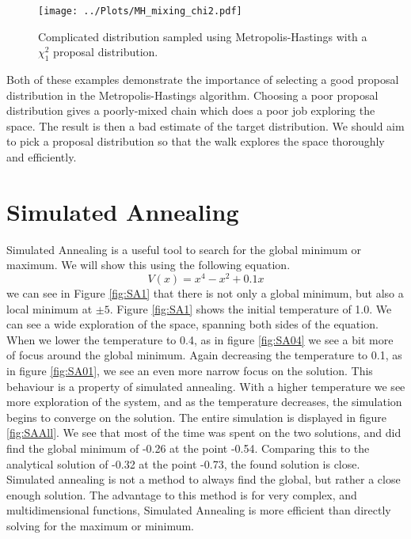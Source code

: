 \documentclass[twocolumn]{myarticle}
\begin{document}
\begin{figure}[ht!]
    \begin{center}
    \texttt{[image: ../Plots/MH\_mixing\_chi2.pdf]}
    \caption{%
        Complicated distribution sampled using Metropolis-Hastings with a $ \chi^2_1 $ proposal distribution.
    }
    \label{fig:mh_mixing_chi2}
    \end{center}
\end{figure}

Both of these examples demonstrate the importance of selecting a good proposal distribution in the Metropolis-Hastings algorithm.
Choosing a poor proposal distribution gives a poorly-mixed chain which does a poor job exploring the space.
The result is then a bad estimate of the target distribution.
We should aim to pick a proposal distribution so that the walk explores the space thoroughly and efficiently.

\section{Simulated Annealing}
Simulated Annealing is a useful tool to search for the global minimum or maximum. We will show this using the following equation.
\begin{equation}
V(x) = x^4 - x^2 + 0.1x
\end{equation}
we can see in Figure \ref{fig:SA1} that there is not only a global minimum, but also a local minimum at $\pm 5$. Figure \ref{fig:SA1} shows the initial temperature of 1.0. We can see a wide exploration of the space, spanning both sides of the equation. When we lower the temperature to 0.4, as in figure \ref{fig:SA04} we see a bit more of focus around the global minimum. Again decreasing the temperature to 0.1, as in figure \ref{fig:SA01}, we see an even more narrow focus on the solution. This behaviour is a property of simulated annealing. With a higher temperature we see more exploration of the system, and as the temperature decreases, the simulation begins to converge on the solution. The entire simulation is displayed in figure \ref{fig:SAAll}. We see that most of the time was spent on the two solutions, and did find the global minimum of -0.26 at the point -0.54. Comparing this to the analytical solution of -0.32 at the point -0.73, the found solution is close. Simulated annealing is not a method to always find the global, but rather a close enough solution. The advantage to this method is for very complex, and multidimensional functions, Simulated Annealing is more efficient than directly solving for the maximum or minimum.  
\end{document}
